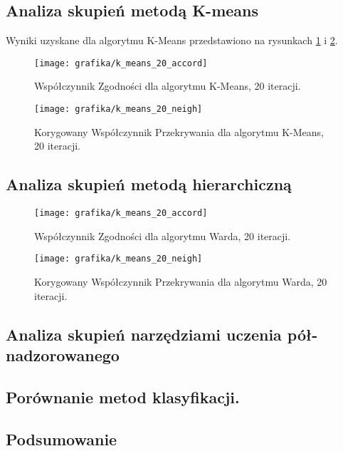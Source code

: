 \documentclass{article}
\begin{document}
\subsection{Analiza skupień metodą K-means}
\label{roz_anal_k_means}
Wyniki uzyskane dla algorytmu K-Means przedstawiono na rysunkach \ref{rysKMeansAccord} i \ref{rysKMeansNeigh}.
\begin{figure}
\caption{Współczynnik Zgodności dla algorytmu K-Means, 20 iteracji.}
\label{rysKMeansAccord}
\texttt{[image: grafika/k\_means\_20\_accord]}
\end{figure}

\begin{figure}
\caption{Korygowany Współczynnik Przekrywania dla algorytmu K-Means, 20 iteracji.}
\label{rysKMeansNeigh}
\texttt{[image: grafika/k\_means\_20\_neigh]}
\end{figure}


\subsection{Analiza skupień metodą hierarchiczną}
\label{roz_anal_ward}

\begin{figure}
\caption{Współczynnik Zgodności dla algorytmu Warda, 20 iteracji.}
\label{rysWardAccord}
\texttt{[image: grafika/k\_means\_20\_accord]}
\end{figure}

\begin{figure}
\caption{Korygowany Współczynnik Przekrywania dla algorytmu Warda, 20 iteracji.}
\label{rysWardNeigh}
\texttt{[image: grafika/k\_means\_20\_neigh]}
\end{figure}



\subsection{Analiza skupień narzędziami uczenia pół-nadzorowanego}
\label{roz_anal_semi}
\subsection{Porównanie metod klasyfikacji.}
\subsection{Podsumowanie}



\end{document}
